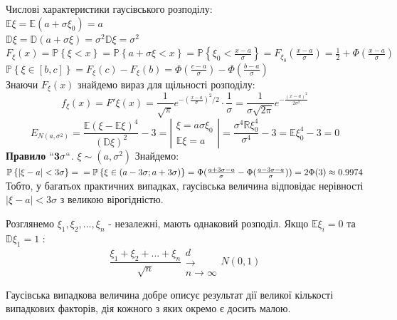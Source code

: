 \documentclass[fontsize=14pt,a4paper]{scrartcl}
\theoremstyle{definition}
\theoremstyle{remark}
\theoremstyle{definition}
\theoremstyle{definition}
\begin{document}
Числові характеристики гаусівського розподілу:\\
$\mathbb{E} \xi = \mathbb{E}(a + \sigma \xi_0) = a$\\
$\mathbb{D} \xi = \mathbb{D} (a + \sigma \xi) = \sigma^2 \mathbb{D} \xi = \sigma^2$\\
$ F_ \xi (x) = \mathbb{P} \left\lbrace \xi <x \right\rbrace = \mathbb{P} \left\lbrace a + \sigma\xi  < x \right\rbrace = \mathbb{P} \left\lbrace \xi_0 < \frac{x-a}{ \sigma}  \right\rbrace = F_ { \xi_0}( \frac{x-a}{\sigma} 	) = \frac{1}{2} + \Phi ( \frac{x-a}{\sigma} ) $ \\
$\mathbb{P} \left\lbrace  \xi \in [b,c] \right\rbrace = F_ \xi (c) - F_ \xi (b) = \Phi( \frac{c-a}{\sigma} ) - \Phi( \frac{b-a}{\sigma} )$\\

Знаючи $ F_ \xi (x) $  знайдемо вираз для щільності розподілу:
$$
f_ \xi (x ) = F' \xi (x) =  \frac{1}{\sqrt{\pi}} e^{ - (\frac{x-a}{\sigma})^2/2 } \cdot \frac{1}{\sigma}  =  \frac{1}{\sigma \sqrt{2\pi}} e^ { - \frac{(x-a)^2}{2 \sigma^2} }
$$
$$
E_{N(a, \sigma^2)} =  \frac{ \mathbb{E} \left( \xi - \mathbb{E} \xi \right)^4 }{ \left( \mathbb{D} \xi \right)^2 }  -3
 =\left|
\begin{gathered}
 \xi = a \sigma \xi_0 \\
 \mathbb{E} \xi = a
\end{gathered}
 \right|
 = \frac{ \sigma ^4 \mathbb{R} \xi_0^4 }{ \sigma^4} - 3 = \mathbb{E} \xi_0^4 - 3 = 0
$$
\textbf{Правило } $ \mathbf{``3 \sigma``}$. \quad $ \xi \sim (a, \sigma^2)$ \quad Знайдемо:
$\mathbb{P} \left\lbrace  \left| \xi - a \right | < 3 \sigma  \right\rbrace
 = \\ = \mathbb{P} \left\lbrace  \xi \in (a - 3 \sigma; a + 3\sigma) \right\rbrace
= \Phi ( \frac{a + 3\sigma  -a  }{\sigma}  - \Phi( \frac{a - 3\sigma - a}{\sigma} )) = 2\Phi (3) \approx 0.9974
$\\
Тобто, у багатьох практичних випадках, гаусівська величина відповідає нерівності $\left| \xi - a \right | < 3 \sigma$ з великою вірогідністю.\\


\begin{boxteo}
Розглянемо $\xi_1, \xi_2, ... , \xi_n$ - незалежні, мають однаковий розподіл.
Якщо $\mathbb{E} \xi_i = 0 $ та $\mathbb{D} \xi_1 = 1$ :
$$
\frac{\xi_1 + \xi_2 + ... + \xi_n}{\sqrt{n}} \begin{gathered}
 d\\ \longrightarrow \\
 n \to \infty
\end{gathered}  N (0,1)
$$
\end{boxteo}
Гаусівська випадкова величина добре описує результат дії великої кількості випадкових факторів, дія кожного з яких окремо є досить малою.
\end{document}

